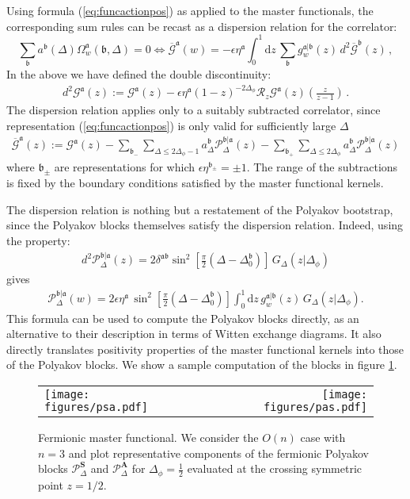 \documentclass[12pt]{article}
\numberwithin{equation}{section}
\newcommand{\reef}[1]{(\ref{#1})}
\newcommand{\bea}{\begin{eqnarray}}
\newcommand{\eea}{\end{eqnarray}}
\newcommand{\ud}{\mathrm d}
\newcommand{\mbf}{\mathbf}
\newcommand{\Df}{{\Delta_\phi}}
\newcommand{\mf}[1]{\mathfrak #1}
\begin{document}
	Using formula \reef{eq:funcactionpos} as applied to the master functionals, the corresponding sum rules can be recast as a dispersion relation for the correlator:
	\begin{equation}
	\sum_{\mf b} a^{\mf b}(\Delta) \Omega^{\mf a}_w(\mf b,\Delta)=0\Leftrightarrow
	\boxed{ \overline{\mathcal G}^{\mf a}(w)=-\epsilon \eta^{\mf a}\int_0^1 \ud z\, \sum_{\mf b} g^{\mf a|\mf b}_w(z) \,d^2 \overline{\mathcal G}^{\mf b}(z)
	}\,,
	\end{equation}
	In the above we have defined the double discontinuity: 
	\bea
	d^2\mathcal G^{\mf a}(z):=\mathcal G^{\mf a}(z)-\epsilon\eta^{\mf a}(1-z)^{-2\Df} \mathcal R_z \mathcal G^{\mf a}(z)(\mbox{$\frac z{z-1}$})\,.
	\eea
	The dispersion relation applies only to a suitably subtracted correlator, since representation \reef{eq:funcactionpos} is only valid for sufficiently large $\Delta$
	\bea
	\overline{\mathcal G}^{\mf a}(z):=\mathcal G^{\mf a}(z)-\sum_{\mf b_-}\sum_{\Delta\leq 2\Df-1} a^{\mf b}_{\Delta} \mathcal P^{\mf b|\mf a}_\Delta(z)-\sum_{\mf b_+}\sum_{\Delta\leq 2\Df} a^{\mf b}_{\Delta} \mathcal P_\Delta^{\mf b|\mf a}(z)
	\eea
	where $\mf b_{\pm}$ are representations for which $\epsilon \eta^{\mf b_\pm}=\pm 1$. The range of the subtractions is fixed by the boundary conditions satisfied by the master functional kernels. 
	
	The dispersion relation is nothing but a restatement of the Polyakov bootstrap, since the Polyakov blocks themselves satisfy the dispersion relation. Indeed, using the property:
	\bea
	d^2 \mathcal P^{\mf b|\mf a}_\Delta(z)=2 \delta^{\mf a \mf b} \sin^2\left[\frac{\pi}2(\Delta-\Delta^{\mf b}_0)\right]\,G_{\Delta}(z|\Df)
	\eea
	gives
	\bea
	\mathcal P_{\Delta}^{\mf b|\mf a}(w)=2\epsilon \eta^{\mf a}\, \sin^2\left[\frac{\pi}2(\Delta-\Delta^{\mf b}_0)\right] \int_0^1 \ud z\, g^{\mf a|\mf b}_w(z)\,G_{\Delta}(z|\Df).
	\eea
	This formula can be used to compute the Polyakov blocks directly, as an alternative to their description in terms of Witten exchange diagrams. It also directly translates positivity properties of the master functional kernels into those of the Polyakov blocks. We show a sample computation of the blocks in figure \ref{fig:mf}.
	
		\begin{figure}[t]
		\begin{center}
			\begin{tabular}{lr}
				\texttt{[image: figures/psa.pdf]}
				&
				\texttt{[image: figures/pas.pdf]}
			\end{tabular}
			\caption{\label{fig:mf} Fermionic master functional. We consider the $O(n)$ case with $n=3$ and plot representative components of the fermionic Polyakov blocks $\mathcal P_{\Delta}^{\mbf S}$ and $\mathcal P_{\Delta}^{\mbf A}$ for $\Df=\frac 12$ evaluated at the crossing symmetric point $z=1/2$.}
		\end{center}
	\end{figure}
	
\end{document}
